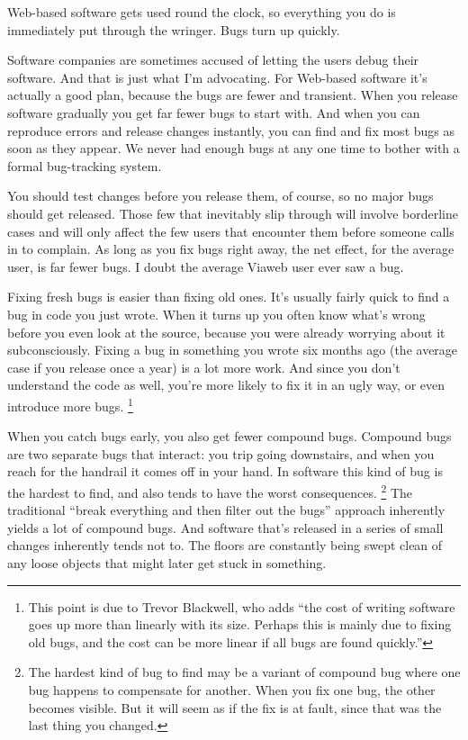 Web-based software gets used round the clock, so everything you do is
immediately put through the wringer. Bugs turn up quickly.

Software companies are sometimes accused of letting the users debug
their software. And that is just what I'm advocating. For Web-based
software it's actually a good plan, because the bugs are fewer and
transient. When you release software gradually you get far fewer bugs to
start with. And when you can reproduce errors and release changes
instantly, you can find and fix most bugs as soon as they appear. We
never had enough bugs at any one time to bother with a formal
bug-tracking system.

You should test changes before you release them, of course, so no major
bugs should get released. Those few that inevitably slip through will
involve borderline cases and will only affect the few users that
encounter them before someone calls in to complain. As long as you fix
bugs right away, the net effect, for the average user, is far fewer
bugs. I doubt the average Viaweb user ever saw a bug.

Fixing fresh bugs is easier than fixing old ones. It's usually fairly
quick to find a bug in code you just wrote. When it turns up you often
know what's wrong before you even look at the source, because you were
already worrying about it subconsciously. Fixing a bug in something you
wrote six months ago (the average case if you release once a year) is a
lot more work. And since you don't understand the code as well, you're
more likely to fix it in an ugly way, or even introduce more bugs.
\footnote{This point is due to Trevor Blackwell, who adds ``the cost of
writing software goes up more than linearly with its size. Perhaps this
is mainly due to fixing old bugs, and the cost can be more linear if all
bugs are found quickly.''}

When you catch bugs early, you also get fewer compound bugs. Compound
bugs are two separate bugs that interact: you trip going downstairs, and
when you reach for the handrail it comes off in your hand. In software
this kind of bug is the hardest to find, and also tends to have the
worst consequences. \footnote{The hardest kind of bug to find may be a variant of compound bug
where one bug happens to compensate for another. When you fix one bug,
the other becomes visible. But it will seem as if the fix is at fault,
since that was the last thing you changed.} The traditional ``break everything and then
filter out the bugs'' approach inherently yields a lot of compound bugs.
And software that's released in a series of small changes inherently
tends not to. The floors are constantly being swept clean of any loose
objects that might later get stuck in something.

